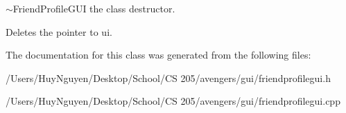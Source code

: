 $\sim$\+Friend\+Profile\+G\+UI the class destructor. 

Deletes the pointer to ui. 

The documentation for this class was generated from the following files\+:\begin{DoxyCompactItemize}
\item 
/\+Users/\+Huy\+Nguyen/\+Desktop/\+School/\+C\+S 205/avengers/gui/friendprofilegui.\+h\item 
/\+Users/\+Huy\+Nguyen/\+Desktop/\+School/\+C\+S 205/avengers/gui/friendprofilegui.\+cpp\end{DoxyCompactItemize}
